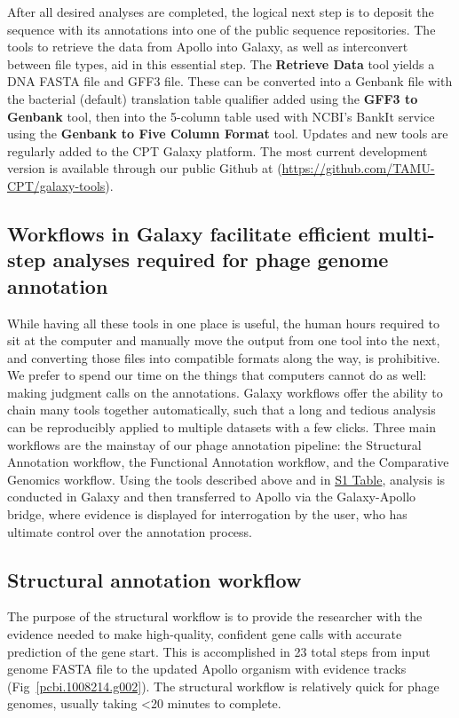 After all desired analyses are completed, the logical next step is to
deposit the sequence with its annotations into one of the public
sequence repositories. The tools to retrieve the data from Apollo into
Galaxy, as well as interconvert between file types, aid in this
essential step. The \textbf{Retrieve Data} tool yields a DNA FASTA file
and GFF3 file. These can be converted into a Genbank file with the
bacterial (default) translation table qualifier added using the
\textbf{GFF3 to Genbank} tool, then into the 5-column table used with
NCBI's BankIt service using the \textbf{Genbank to Five Column Format}
tool. Updates and new tools are regularly added to the CPT Galaxy
platform. The most current development version is available through our
public Github at (\url{https://github.com/TAMU-CPT/galaxy-tools}).

\subsection*{Workflows in Galaxy facilitate efficient multi-step analyses required for phage genome annotation}

While having all these tools in one place is useful, the human hours
required to sit at the computer and manually move the output from one
tool into the next, and converting those files into compatible formats
along the way, is prohibitive. We prefer to spend our time on the things
that computers cannot do as well: making judgment calls on the
annotations. Galaxy workflows offer the ability to chain many tools
together automatically, such that a long and tedious analysis can be
reproducibly applied to multiple datasets with a few clicks. Three main
workflows are the mainstay of our phage annotation pipeline: the
Structural Annotation workflow, the Functional Annotation workflow, and
the Comparative Genomics workflow. Using the tools described above and
in \protect\hyperlink{pcbi.1008214.s001}{S1 Table}, analysis is
conducted in Galaxy and then transferred to Apollo via the Galaxy-Apollo
bridge, where evidence is displayed for interrogation by the user, who
has ultimate control over the annotation process.

\subsection*{Structural annotation workflow}

The purpose of the structural workflow is to provide the researcher with
the evidence needed to make high-quality, confident gene calls with
accurate prediction of the gene start. This is accomplished in 23 total
steps from input genome FASTA file to the updated Apollo organism with
evidence tracks (Fig~\ref{pcbi.1008214.g002}). The
structural workflow is relatively quick for phage genomes, usually
taking \textless20 minutes to complete.

